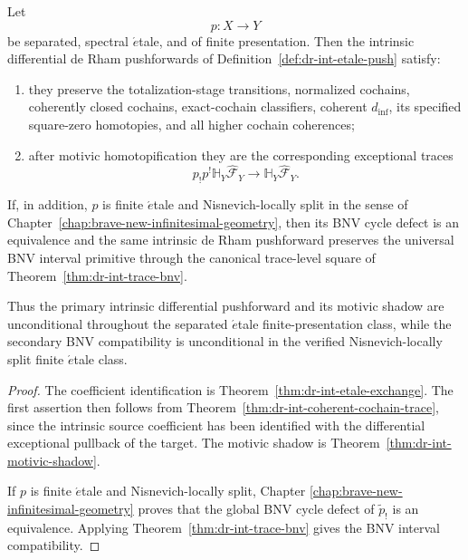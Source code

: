 \begin{theorem}
\label{thm:dr-int-finite-etale-main}
Let
\[
    p:X\longrightarrow Y
\]
be separated, spectral \(\acute{e}\)tale, and of finite presentation.  Then
the intrinsic differential de Rham pushforwards of
Definition~\ref{def:dr-int-etale-push} satisfy:

\begin{enumerate}
\item they preserve the totalization-stage transitions, normalized cochains,
coherently closed cochains, exact-cochain classifiers, coherent
\(d_{\inf}\), its specified square-zero homotopies, and all higher cochain
coherences;

\item after motivic homotopification they are the corresponding exceptional
traces
\[
\boxed{
    p_!p^!
    \mathbb H_Y\widehat{\mathscr F}_Y
    \longrightarrow
    \mathbb H_Y\widehat{\mathscr F}_Y.
}
\]
\end{enumerate}

If, in addition, \(p\) is finite \(\acute{e}\)tale and
Nisnevich-locally split in the sense of
Chapter~\ref{chap:brave-new-infinitesimal-geometry}, then its BNV cycle defect
is an equivalence and the same intrinsic de Rham pushforward preserves the
universal BNV interval primitive through the canonical trace-level square of
Theorem~\ref{thm:dr-int-trace-bnv}.

Thus the primary intrinsic differential pushforward and its motivic shadow are
unconditional throughout the separated \(\acute{e}\)tale finite-presentation
class, while the secondary BNV compatibility is unconditional in the verified
Nisnevich-locally split finite \(\acute{e}\)tale class.
\end{theorem}

\begin{proof}
The coefficient identification is
Theorem~\ref{thm:dr-int-etale-exchange}.  The first assertion then follows
from Theorem~\ref{thm:dr-int-coherent-cochain-trace}, since the intrinsic
source coefficient has been identified with the differential exceptional
pullback of the target.  The motivic shadow is
Theorem~\ref{thm:dr-int-motivic-shadow}.

If \(p\) is finite \(\acute{e}\)tale and Nisnevich-locally split, Chapter
\ref{chap:brave-new-infinitesimal-geometry} proves that the global BNV cycle
defect of \(\widetilde p_!\) is an equivalence.  Applying
Theorem~\ref{thm:dr-int-trace-bnv} gives the BNV interval compatibility.
\end{proof}


